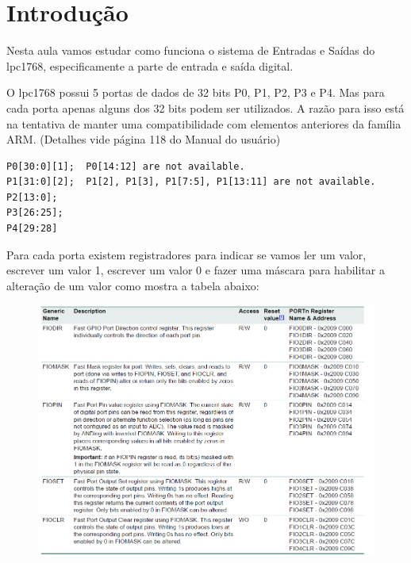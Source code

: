 \documentclass[a4paper,10pt]{article}
\begin{document}
 
\section{Introdução}

Nesta aula vamos estudar como funciona o sistema de Entradas e Saídas do lpc1768, especificamente a parte de entrada e saída digital.

O lpc1768 possui 5 portas de dados de 32 bits P0, P1, P2, P3 e P4. Mas para cada porta apenas alguns dos 32 bits podem ser utilizados. A razão para isso está na 
tentativa de manter uma compatibilidade com elementos anteriores da família ARM. (Detalhes vide página 118 do Manual do usuário)

\begin{lstlisting}
P0[30:0][1];  P0[14:12] are not available.
P1[31:0][2];  P1[2], P1[3], P1[7:5], P1[13:11] are not available.
P2[13:0]; 
P3[26:25];
P4[29:28]
\end{lstlisting}

Para cada porta existem registradores para indicar se vamos ler um valor, escrever um valor 1, escrever um valor 0 e fazer uma máscara para habilitar a alteração 
de um valor como mostra a tabela abaixo:

\begin{figure}[!htb]
 \centering\includegraphics[width=\textwidth]{io}
\end{figure}
\end{document}
